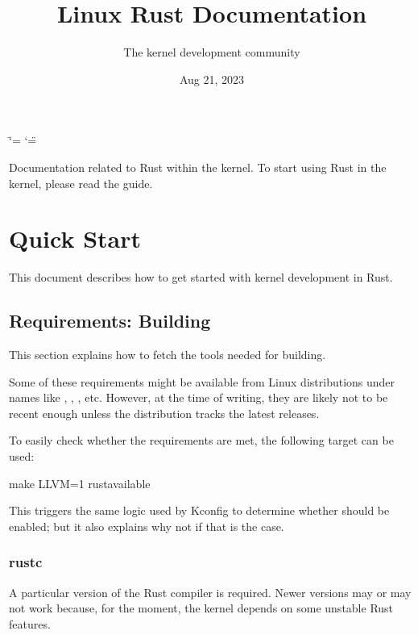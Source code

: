\documentclass[a4paper,11pt,english]{sphinxmanual}
\title{Linux Rust Documentation}
\date{Aug 21, 2023}
\author{The kernel development community}
\begin{document}
\ifdefined\shorthandoff
  \ifnum\catcode`\=\string=\active\shorthandoff{=}\fi
  \ifnum\catcode`\"=\active{}\fi
\fi

\pagestyle{empty}
\sphinxmaketitle
\pagestyle{plain}
\sphinxtableofcontents
\pagestyle{normal}
\label{\detokenize{index::doc}}


Documentation related to Rust within the kernel. To start using Rust
in the kernel, please read the {\hyperref[\detokenize{quick-start::doc}]{}} guide.


\chapter{Quick Start}
\label{\detokenize{quick-start:quick-start}}\label{\detokenize{quick-start::doc}}
This document describes how to get started with kernel development in Rust.


\section{Requirements: Building}
\label{\detokenize{quick-start:requirements-building}}
This section explains how to fetch the tools needed for building.

Some of these requirements might be available from Linux distributions
under names like , , , etc. However,
at the time of writing, they are likely not to be recent enough unless
the distribution tracks the latest releases.

To easily check whether the requirements are met, the following target
can be used:

\begin{sphinxVerbatim}[commandchars=\\\{\}]
make LLVM=1 rustavailable
\end{sphinxVerbatim}

This triggers the same logic used by Kconfig to determine whether
 should be enabled; but it also explains why not
if that is the case.


\subsection{rustc}
\label{\detokenize{quick-start:rustc}}
A particular version of the Rust compiler is required. Newer versions may or
may not work because, for the moment, the kernel depends on some unstable
Rust features.
\end{document}
